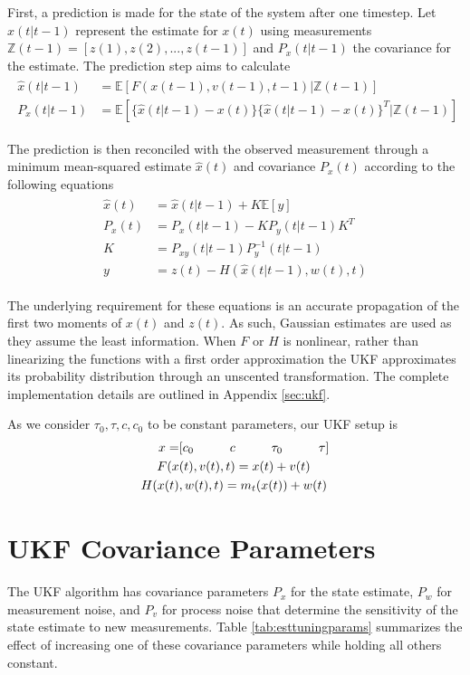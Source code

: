 First, a prediction is made for the state of the system after one timestep. Let $\hat{x}(t\vert t-1)$ represent the estimate for $x(t)$ using measurements $\mathbb{Z}(t-1)=[z(1), z(2), ..., z(t-1)]$ and $P_{x}(t\vert t-1)$ the covariance for the estimate. The prediction step aims to calculate
\begin{align}\begin{split}
  \hat{x}(t\vert t-1) &= \mathbb{E}[F(x(t-1), v(t-1), t-1)\vert \mathbb{Z}(t-1)]\\
  P_{x}(t\vert t-1) &= \mathbb{E}[\{ \hat{x}(t\vert t-1) - x(t) \} \{ \hat{x}(t\vert t-1) - x(t) \}^T \vert \mathbb{Z}(t-1)]
\end{split}\end{align}

The prediction is then reconciled with the observed measurement through a minimum mean-squared estimate $\hat{x}(t)$ and covariance $P_{x}(t)$ according to the following equations
\begin{align}
\begin{split}
  \hat{x}(t) &= \hat{x}(t\vert t-1) + K \mathbb{E}[y] \\
  P_{x}(t) &= P_{x}(t\vert t-1) - KP_{y}(t\vert t-1) K^T\\
  K &= P_{xy}(t\vert t-1) P_{y}^{-1}(t\vert t-1)\\
  y &= z(t) - H(\hat{x}(t\vert t-1) , w(t), t)
\end{split}
\end{align}

The underlying requirement for these equations is an accurate propagation of the first two moments of $x(t)$ and $z(t)$. As such, Gaussian estimates are used as they assume the least information. When $F$ or $H$ is nonlinear, rather than linearizing the functions with a first order approximation the UKF approximates its probability distribution through an unscented transformation. The complete implementation details are outlined in Appendix \ref{sec:ukf}.

As we consider $\tau_0, \tau, c, c_0$ to be constant parameters, our UKF setup is
\begin{align}
\begin{split}
  x = &[c_0 \hspace*{1cm} c \hspace*{1cm} \tau_0 \hspace*{1cm} \tau]\\
  F(x&(t), v(t), t) = x(t) + v(t)\\
  H(x(t)&, w(t), t) = m_t(x(t)) + w(t)
\end{split}
\end{align}

\section{UKF Covariance Parameters}\label{sec:ukfcovar}
The UKF algorithm has covariance parameters $P_{x}$ for the state estimate, $P_{w}$ for measurement noise, and $P_{v}$ for process noise that determine the sensitivity of the state estimate to new measurements. Table \ref{tab:esttuningparams} summarizes the effect of increasing one of these covariance parameters while holding all others constant.

